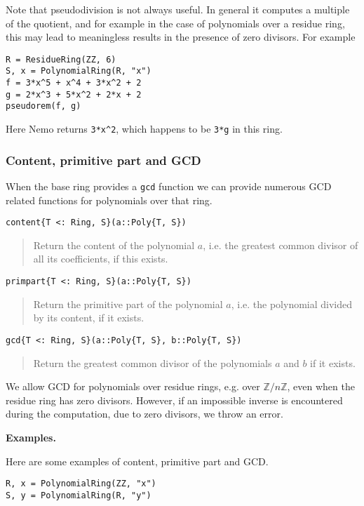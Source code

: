 \documentclass[a4paper,10pt]{article}
\newcommand{\Z}{\mathbb{Z}}
\newcommand{\code}{\lstinline}
\newcommand{\desc}[1]{\vspace{-3mm}\begin{quote}#1\end{quote}}
\begin{document}
{{{Note that pseudodivision is not always useful. In general it computes a
multiple of the quotient, and for example in the case of polynomials over a
residue ring, this may lead to meaningless results in the presence of zero
divisors. For example

\begin{lstlisting}
R = ResidueRing(ZZ, 6)
S, x = PolynomialRing(R, "x")
f = 3*x^5 + x^4 + 3*x^2 + 2
g = 2*x^3 + 5*x^2 + 2*x + 2
pseudorem(f, g)
\end{lstlisting}

Here Nemo returns \code{3*x^2}, which happens to be \code{3*g} in this
ring.

\subsubsection{Content, primitive part and GCD}

When the base ring provides a \code{gcd} function we can provide numerous
GCD related functions for polynomials over that ring.

\begin{lstlisting}
content{T <: Ring, S}(a::Poly{T, S})
\end{lstlisting}

\desc{Return the content of the polynomial $a$, i.e. the greatest common divisor
of all its coefficients, if this exists.}

\begin{lstlisting}
primpart{T <: Ring, S}(a::Poly{T, S})
\end{lstlisting}

\desc{Return the primitive part of the polynomial $a$, i.e. the polynomial
divided by its content, if it exists.}

\begin{lstlisting}
gcd{T <: Ring, S}(a::Poly{T, S}, b::Poly{T, S})
\end{lstlisting}

\desc{Return the greatest common divisor of the polynomials $a$ and $b$ if 
it exists.}

We allow GCD for polynomials over residue rings, e.g. over $\Z/n\Z$, even when
the residue ring has zero divisors. However, if an impossible inverse is
encountered during the computation, due to zero divisors, we throw an error.

\textbf{Examples.}

Here are some examples of content, primitive part and GCD.

\begin{lstlisting}
R, x = PolynomialRing(ZZ, "x")
S, y = PolynomialRing(R, "y")


\end{lstlisting}}}}
\end{document}
